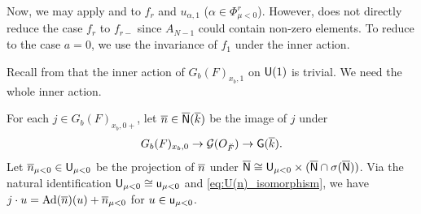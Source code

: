\documentclass[12pt,reqno]{amsart}
\begin{document}
Now, we may apply  and  to $f_r$ and $u_{\alpha, 1}$ ($\alpha \in \Phi^r_{\mu < 0}$). However,  does not directly reduce the case $f_r$ to $f_{r -}$ since $A_{N - 1}$ could contain non-zero elements. To reduce to the case $a = 0$, we use the invariance of $f_1$ under the inner action. 

Recall from  that the inner action of $G_b(F)_{x_b, 1}$ on ${\mathsf{U}}(1)$ is trivial. We need the whole inner action. 

\begin{lem} \label{lem:reduction_inner_action}
    For each $j \in G_b(F)_{x_b, 0+}$, let ${\overline{n}} \in {\mathsf{{\overline{N}}}}({\overline{k}})$ be the image of $j$ under 
    \[
        G_b(F)_{x_b, 0} \to {\mathcal{G}}(O_{\breve{F}}) \to {\mathsf{G}}({\overline{k}}). 
    \]
    Let ${\overline{n}}_{\mu < 0} \in {\mathsf{U}}_{\mu < 0}$ be the projection of ${\overline{n}}$ under ${\mathsf{{\overline{N}}}} \cong {\mathsf{U}}_{\mu < 0} \times ({\mathsf{{\overline{N}}}} \cap \sigma({\mathsf{{\overline{N}}}}))$. Via the natural identification ${\mathsf{U}}_{\mu < 0} \cong {\mathsf{u}}_{\mu < 0}$ and \eqref{eq:U(n)_isomorphism}, we have $j \cdot u = {\operatorname{Ad}}({\overline{n}})(u) + {\overline{n}}_{\mu < 0}$ for $u \in {\mathsf{u}}_{\mu < 0}$. 
\end{lem}
\end{document}
